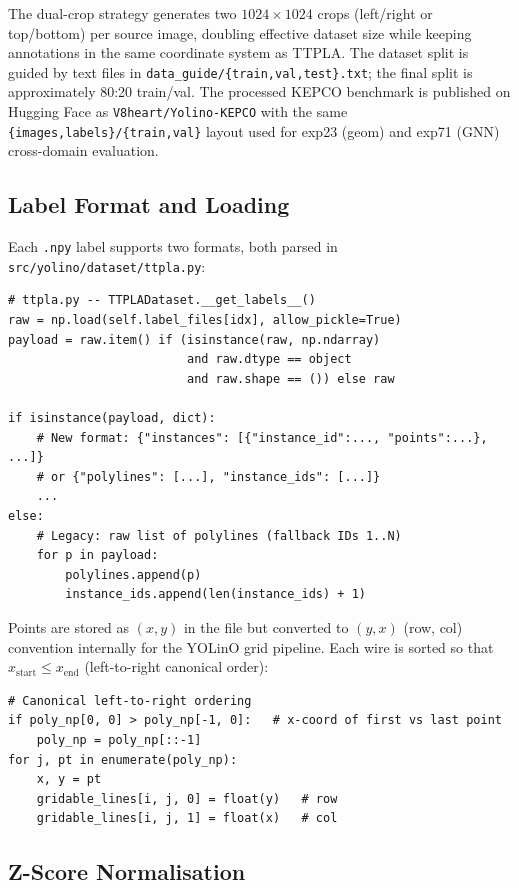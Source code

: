 \documentclass[11pt,a4paper]{article}
\begin{document}
The dual-crop strategy generates two $1024 \times 1024$ crops (left/right or top/bottom)
per source image, doubling effective dataset size while keeping annotations in the same
coordinate system as TTPLA.
The dataset split is guided by text files in \texttt{data\_guide/\{train,val,test\}.txt};
the final split is approximately 80:20 train/val.
The processed KEPCO benchmark is published on Hugging Face as
\texttt{V8heart/Yolino-KEPCO} with the same
\texttt{\{images,labels\}/\{train,val\}} layout used for exp23 (geom) and exp71 (GNN)
cross-domain evaluation.

\subsection{Label Format and Loading}
\label{subsec:label_loading}

Each \texttt{.npy} label supports two formats, both parsed in
\texttt{src/yolino/dataset/ttpla.py}:

\begin{lstlisting}
# ttpla.py -- TTPLADataset.__get_labels__()
raw = np.load(self.label_files[idx], allow_pickle=True)
payload = raw.item() if (isinstance(raw, np.ndarray)
                         and raw.dtype == object
                         and raw.shape == ()) else raw

if isinstance(payload, dict):
    # New format: {"instances": [{"instance_id":..., "points":...}, ...]}
    # or {"polylines": [...], "instance_ids": [...]}
    ...
else:
    # Legacy: raw list of polylines (fallback IDs 1..N)
    for p in payload:
        polylines.append(p)
        instance_ids.append(len(instance_ids) + 1)
\end{lstlisting}

Points are stored as $(x, y)$ in the file but converted to $(y, x)$ (row, col)
convention internally for the YOLinO grid pipeline. Each wire is sorted so that
$x_{\text{start}} \le x_{\text{end}}$ (left-to-right canonical order):

\begin{lstlisting}
# Canonical left-to-right ordering
if poly_np[0, 0] > poly_np[-1, 0]:   # x-coord of first vs last point
    poly_np = poly_np[::-1]
for j, pt in enumerate(poly_np):
    x, y = pt
    gridable_lines[i, j, 0] = float(y)   # row
    gridable_lines[i, j, 1] = float(x)   # col
\end{lstlisting}

\subsection{Z-Score Normalisation}
\label{subsec:normalization}
\end{document}
